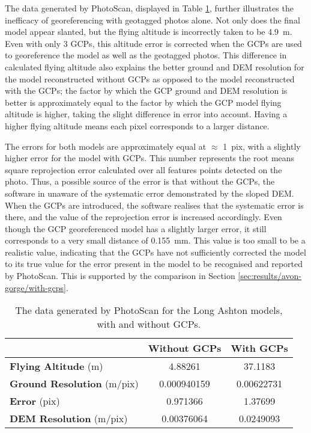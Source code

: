The data generated by PhotoScan, displayed in Table \ref{tab:long-ashton},
further illustrates the inefficacy of georeferencing with geotagged photos
alone. Not only does the final model appear slanted, but the flying altitude is
incorrectly taken to be \SI{4.9}{m}. Even with only 3 GCPs, this altitude error
is corrected when the GCPs are used to georeference the model as well as the
geotagged photos. This difference in calculated flying altitude also explains
the better ground and DEM resolution for the model reconstructed without GCPs as
opposed to the model reconstructed with the GCPs; the factor by which the GCP
ground and DEM resolution is better is approximately equal to the factor by
which the GCP model flying altitude is higher, taking the slight difference in
error into account. Having a higher flying altitude means each pixel corresponds
to a larger distance.

The errors for both models are approximately equal at $\approx$ \SI{1}{pix},
with a slightly higher error for the model with GCPs. This number
represents the root means square reprojection error calculated over all features
points detected on the photo. Thus, a possible source of the error is that
without the GCPs, the software in unaware of the systematic error demonstrated
by the sloped DEM. When the GCPs are introduced, the software realises that the
systematic error is there, and the value of the reprojection error is increased
accordingly. Even though the GCP georeferenced model has a slightly larger
error, it still corresponds to a very small distance of \SI{0.155}{mm}. This
value is too small to be a realistic value, indicating that the GCPs have not
sufficiently corrected the model to its true value for the error present in the
model to be recognised and reported by PhotoScan. This is supported by the
comparison in Section \ref{sec:results/avon-gorge/with-gcps}.

\begin{table}
    \begin{tabular}{| l | c | c |}
        \hline
        & \textbf{Without GCPs} & \textbf{With GCPs} \\
        \hline
        \textbf{Flying Altitude} (m)       & 4.88261     & 37.1183    \\
        \textbf{Ground Resolution} (m/pix) & 0.000940159 & 0.00622731 \\
        \textbf{Error} (pix)               & 0.971366    & 1.37699    \\
        \textbf{DEM Resolution} (m/pix)    & 0.00376064  & 0.0249093  \\
        \hline
    \end{tabular}
    \caption{The data generated by PhotoScan for the Long Ashton models, with
    and without GCPs.}
    \label{tab:long-ashton}
\end{table}

